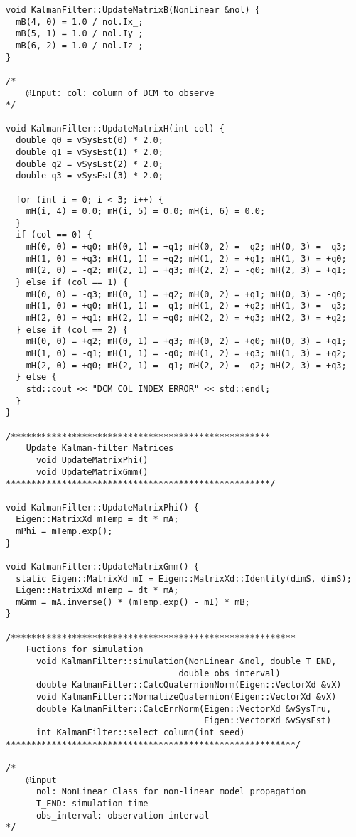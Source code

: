 \documentclass[class=article, crop=false, dvipdfmx, fleqn]{standalone}
\begin{document}
\begin{lstlisting}[caption=kalman$\_$filter.cpp (カルマンフィルタ用クラス(source))]
void KalmanFilter::UpdateMatrixB(NonLinear &nol) {
  mB(4, 0) = 1.0 / nol.Ix_;
  mB(5, 1) = 1.0 / nol.Iy_;
  mB(6, 2) = 1.0 / nol.Iz_;
}

/*
    @Input: col: column of DCM to observe
*/

void KalmanFilter::UpdateMatrixH(int col) {
  double q0 = vSysEst(0) * 2.0;
  double q1 = vSysEst(1) * 2.0;
  double q2 = vSysEst(2) * 2.0;
  double q3 = vSysEst(3) * 2.0;

  for (int i = 0; i < 3; i++) {
    mH(i, 4) = 0.0; mH(i, 5) = 0.0; mH(i, 6) = 0.0;
  }
  if (col == 0) {
    mH(0, 0) = +q0; mH(0, 1) = +q1; mH(0, 2) = -q2; mH(0, 3) = -q3;
    mH(1, 0) = +q3; mH(1, 1) = +q2; mH(1, 2) = +q1; mH(1, 3) = +q0;
    mH(2, 0) = -q2; mH(2, 1) = +q3; mH(2, 2) = -q0; mH(2, 3) = +q1;
  } else if (col == 1) {
    mH(0, 0) = -q3; mH(0, 1) = +q2; mH(0, 2) = +q1; mH(0, 3) = -q0;
    mH(1, 0) = +q0; mH(1, 1) = -q1; mH(1, 2) = +q2; mH(1, 3) = -q3;
    mH(2, 0) = +q1; mH(2, 1) = +q0; mH(2, 2) = +q3; mH(2, 3) = +q2;
  } else if (col == 2) {
    mH(0, 0) = +q2; mH(0, 1) = +q3; mH(0, 2) = +q0; mH(0, 3) = +q1;
    mH(1, 0) = -q1; mH(1, 1) = -q0; mH(1, 2) = +q3; mH(1, 3) = +q2;
    mH(2, 0) = +q0; mH(2, 1) = -q1; mH(2, 2) = -q2; mH(2, 3) = +q3;
  } else {
    std::cout << "DCM COL INDEX ERROR" << std::endl;
  }
}

/***************************************************
    Update Kalman-filter Matrices
      void UpdateMatrixPhi()
      void UpdateMatrixGmm()
****************************************************/

void KalmanFilter::UpdateMatrixPhi() {
  Eigen::MatrixXd mTemp = dt * mA;
  mPhi = mTemp.exp();
}

void KalmanFilter::UpdateMatrixGmm() {
  static Eigen::MatrixXd mI = Eigen::MatrixXd::Identity(dimS, dimS);
  Eigen::MatrixXd mTemp = dt * mA;
  mGmm = mA.inverse() * (mTemp.exp() - mI) * mB;
}

/********************************************************
    Fuctions for simulation
      void KalmanFilter::simulation(NonLinear &nol, double T_END,
                                  double obs_interval)
      double KalmanFilter::CalcQuaternionNorm(Eigen::VectorXd &vX)
      void KalmanFilter::NormalizeQuaternion(Eigen::VectorXd &vX)
      double KalmanFilter::CalcErrNorm(Eigen::VectorXd &vSysTru,
                                       Eigen::VectorXd &vSysEst)
      int KalmanFilter::select_column(int seed)
*********************************************************/

/*
    @input
      nol: NonLinear Class for non-linear model propagation
      T_END: simulation time
      obs_interval: observation interval
*/


\end{lstlisting}
\end{document}
